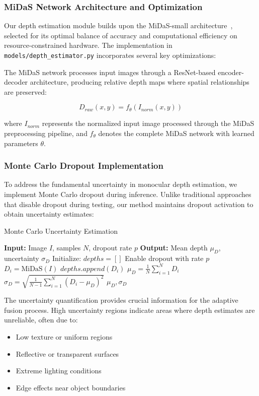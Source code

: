 \documentclass[12pt,oneside]{book}
\begin{document}
\subsubsection{MiDaS Network Architecture and Optimization}

Our depth estimation module builds upon the MiDaS-small architecture~\cite{ranftl2020towards}, selected for its optimal balance of accuracy and computational efficiency on resource-constrained hardware. The implementation in \texttt{models/depth\_estimator.py} incorporates several key optimizations:

The MiDaS network processes input images through a ResNet-based encoder-decoder architecture, producing relative depth maps where spatial relationships are preserved:

\begin{equation}
D_{raw}(x,y) = f_{\theta}(I_{norm}(x,y))
\label{eq:midas_forward}
\end{equation}

where $I_{norm}$ represents the normalized input image processed through the MiDaS preprocessing pipeline, and $f_{\theta}$ denotes the complete MiDaS network with learned parameters $\theta$.

\subsubsection{Monte Carlo Dropout Implementation}

To address the fundamental uncertainty in monocular depth estimation, we implement Monte Carlo dropout during inference. Unlike traditional approaches that disable dropout during testing, our method maintains dropout activation to obtain uncertainty estimates:

\begin{algorithm}
\caption{Monte Carlo Uncertainty Estimation}
\begin{algorithmic}
\STATE \textbf{Input:} Image $I$, samples $N$, dropout rate $p$
\STATE \textbf{Output:} Mean depth $\mu_D$, uncertainty $\sigma_D$
\STATE Initialize: $depths = []$
    \STATE Enable dropout with rate $p$
    \STATE $D_i = \text{MiDaS}(I)$
    \STATE $depths.append(D_i)$
\ENDFOR
\STATE $\mu_D = \frac{1}{N} \sum_{i=1}^{N} D_i$
\STATE $\sigma_D = \sqrt{\frac{1}{N-1} \sum_{i=1}^{N} (D_i - \mu_D)^2}$
\RETURN $\mu_D, \sigma_D$
\end{algorithmic}
\end{algorithm}

The uncertainty quantification provides crucial information for the adaptive fusion process. High uncertainty regions indicate areas where depth estimates are unreliable, often due to:
\begin{itemize}
\item Low texture or uniform regions
\item Reflective or transparent surfaces
\item Extreme lighting conditions
\item Edge effects near object boundaries
\end{itemize}
\end{document}
